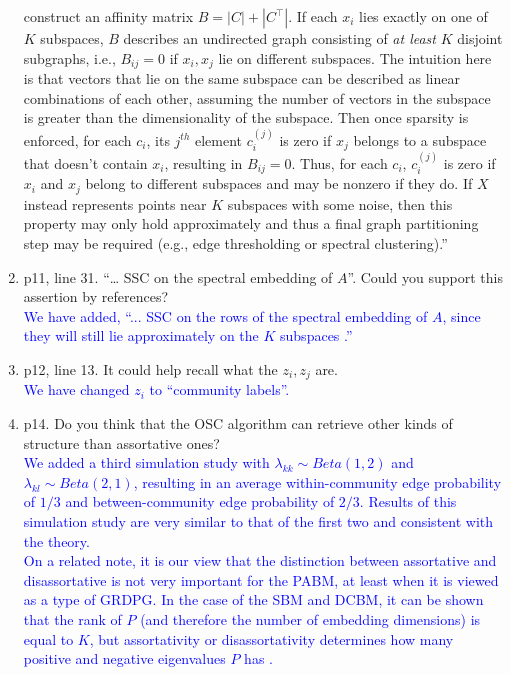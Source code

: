 \documentclass[
]{article}
\begin{document}
\begin{enumerate}
{  construct an affinity matrix \(B = |C| + |C^\top|\). If each \(x_i\) lies
  exactly on one of \(K\) subspaces, \(B\) describes an undirected graph
  consisting of {\em at least} \(K\) disjoint subgraphs, i.e., \(B_{ij} = 0\) if \(x_i, x_j\) lie on different subspaces. 
  The intuition here is that vectors that lie on the same subspace can be described as linear combinations of each other, assuming the number of vectors in the subspace is greater than the dimensionality of the subspace. 
  Then once sparsity is enforced, for each $c_i$, its $j^{th}$ element $c_i^{(j)}$ is zero if $x_j$ belongs to a subspace that doesn't contain $x_i$, resulting in $B_{ij} = 0$. 
  Thus, for each $c_i$, $c_i^{(j)}$ is zero if $x_i$ and $x_j$ belong to different subspaces and may be nonzero if they do. 
  If \(X\) instead represents points near \(K\) subspaces with some noise, 
  then this property may only hold approximately and thus 
  a final graph partitioning step may be required 
  (e.g., edge thresholding or spectral clustering).''
  }
\item
  p11, line 31. ``\ldots{} SSC on the spectral embedding of \(A\)''.
  Could you support this assertion by references?\\
  \textcolor{blue}{
  We have added, ``... SSC on the rows of the spectral embedding of $A$, since they will still lie approximately on the $K$ subspaces \citep{rubindelanchy2017statistical}.''
  }
\item
  p12, line 13. It could help recall what the \(z_i, z_j\) are.\\
  \textcolor{blue}{
  We have changed $z_i$ to ``community labels''.
  }
\item
  p14. Do you think that the OSC algorithm can retrieve other kinds of
  structure than assortative ones?\\
  \textcolor{blue}{
  We added a third simulation study with $\lambda_{kk} \sim Beta(1,2)$ and $\lambda_{kl} \sim Beta(2,1)$, resulting in an average within-community edge probability of $1/3$ and between-community edge probability of $2/3$. 
  Results of this simulation study are very similar to that of the first two and consistent with the theory.
  }\\
  \textcolor{blue}{
  On a related note, it is our view that the distinction between assortative and disassortative is not very important for the PABM, at least when it is viewed as a type of GRDPG. 
  In the case of the SBM and DCBM, it can be shown that the rank of $P$ (and therefore the number of embedding dimensions) is equal to $K$, but assortativity or disassortativity determines how many positive and negative eigenvalues $P$ has \citep{rubindelanchy2017statistical}. 
}
\end{enumerate}
\end{document}
